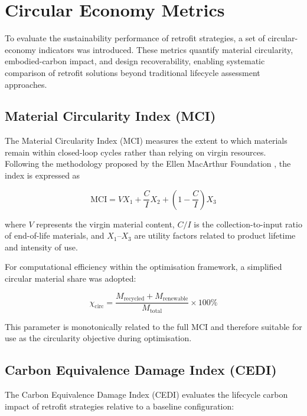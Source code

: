 \documentclass[fleqn,10pt]{wlscirep}
\begin{document}
\section{Circular Economy Metrics}
\label{sec:cemetrics}

To evaluate the sustainability performance of retrofit strategies, a set of circular-economy indicators was introduced. These metrics quantify material circularity, embodied-carbon impact, and design recoverability, enabling systematic comparison of retrofit solutions beyond traditional lifecycle assessment approaches.

\subsection{Material Circularity Index (MCI)}

The Material Circularity Index (MCI) measures the extent to which materials remain within closed-loop cycles rather than relying on virgin resources. Following the methodology proposed by the Ellen MacArthur Foundation \cite{ellen_macarthur_mci}, the index is expressed as

\begin{equation}
\mathrm{MCI} = V X_1 + \frac{C}{I} X_2 + \left(1-\frac{C}{I}\right)X_3
\end{equation}

where $V$ represents the virgin material content, $C/I$ is the collection-to-input ratio of end-of-life materials, and $X_1$–$X_3$ are utility factors related to product lifetime and intensity of use.

For computational efficiency within the optimisation framework, a simplified circular material share was adopted:

\begin{equation}
\chi_{\mathrm{circ}} =
\frac{M_{\mathrm{recycled}} + M_{\mathrm{renewable}}}{M_{\mathrm{total}}}
\times 100\%
\end{equation}

This parameter is monotonically related to the full MCI and therefore suitable for use as the circularity objective during optimisation.

\subsection{Carbon Equivalence Damage Index (CEDI)}

The Carbon Equivalence Damage Index (CEDI) evaluates the lifecycle carbon impact of retrofit strategies relative to a baseline configuration:
\end{document}
